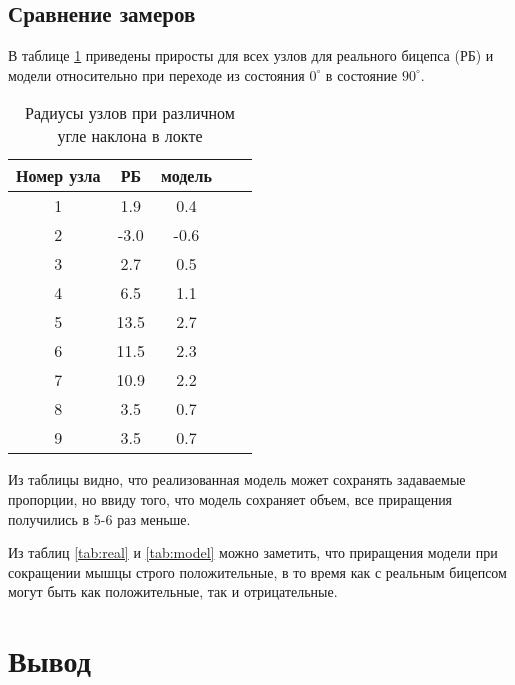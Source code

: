 \subsection{Сравнение замеров}

В таблице \ref{tab:percents} приведены приросты для всех узлов для реального бицепса (РБ) и модели относительно при переходе из состояния $0^\circ$ в состояние $90^\circ$.

\begin{table}[!h]
    \begin{center}
        \begin{tabular}{|c|c|c|c|c|}
            \hline
            Номер узла & РБ & модель \\
            \hline
            \hline
            1 & 1.9 & 0.4 \\
            \hline
            2 & -3.0 & -0.6 \\
            \hline
            3 & 2.7 & 0.5 \\
            \hline
            4 & 6.5 & 1.1 \\
            \hline
            5 & 13.5 & 2.7 \\
            \hline
            6 & 11.5 & 2.3 \\
            \hline
            7 & 10.9 & 2.2 \\
            \hline
            8 & 3.5 & 0.7 \\
            \hline
            9 & 3.5 & 0.7 \\
            \hline
            \hline
        \end{tabular}
    \end{center}
    \caption{\label{tab:percents} Радиусы узлов при различном угле наклона в локте}
\end{table}

Из таблицы видно, что реализованная модель может сохранять задаваемые пропорции, но ввиду того, что модель сохраняет объем, все приращения получились в 5-6 раз меньше.

Из таблиц \ref{tab:real} и \ref{tab:model} можно заметить, что приращения модели при сокращении мышцы строго положительные, в то время как с реальным бицепсом могут быть как положительные, так и отрицательные.


\section*{Вывод}

